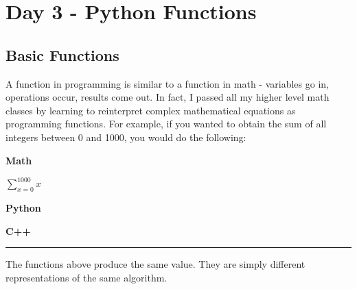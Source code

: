\chapter{Day 3 - Python Functions}
\section{Basic Functions}
A function in programming is similar to a function in math - variables
go in, operations occur, results come out. In fact, I passed all my
higher level math classes by learning to reinterpret
complex mathematical equations as programming functions. For example, if
you wanted to obtain the sum of all integers between 0 and 1000, you
would do the following:

\textbf{Math}

\(\sum\limits_{x=0}^{1000}x\)

\textbf{Python}

\begin{Shaded}
\begin{Highlighting}[]
\OperatorTok{=} 
 \NormalTok{(}\NormalTok{,}\NormalTok{):}
\OperatorTok{+=}
\end{Highlighting}
\end{Shaded}

\textbf{C++}

\begin{Shaded}
\begin{Highlighting}[]
\OperatorTok{=} \OperatorTok{;}
\OperatorTok{(}\OperatorTok{=}\OperatorTok{;}\OperatorTok{\textless{}=}\OperatorTok{;}\OperatorTok{++)}
\OperatorTok{\{}
\OperatorTok{+=}\OperatorTok{;}
\OperatorTok{\}}
\OperatorTok{\textless{}\textless{}}\OperatorTok{\textless{}\textless{}}\OperatorTok{;}
\end{Highlighting}
\end{Shaded}

\begin{center}\rule{0.5\linewidth}{0.5pt}\end{center}

The functions above produce the same value. They are simply different
representations of the same algorithm.

